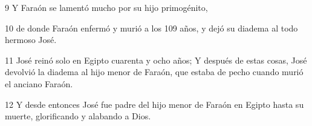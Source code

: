 \par 9 Y Faraón se lamentó mucho por su hijo primogénito,

\par 10 de donde Faraón enfermó y murió a los 109 años, y dejó su diadema al todo hermoso José.

\par 11 José reinó solo en Egipto cuarenta y ocho años; Y después de estas cosas, José devolvió la diadema al hijo menor de Faraón, que estaba de pecho cuando murió el anciano Faraón.

\par 12 Y desde entonces José fue padre del hijo menor de Faraón en Egipto hasta su muerte, glorificando y alabando a Dios.


